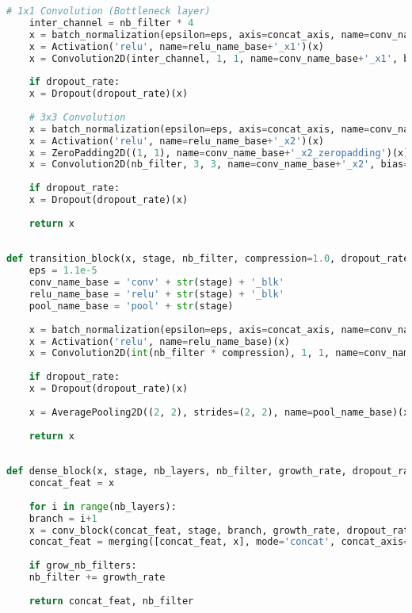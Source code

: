 \begin{lstlisting}[language=Python]
	# 1x1 Convolution (Bottleneck layer)
	inter_channel = nb_filter * 4  
	x = batch_normalization(epsilon=eps, axis=concat_axis, name=conv_name_base+'_x1_bn')(x)
	x = Activation('relu', name=relu_name_base+'_x1')(x)
	x = Convolution2D(inter_channel, 1, 1, name=conv_name_base+'_x1', bias=False)(x)
	
	if dropout_rate:
	x = Dropout(dropout_rate)(x)
	
	# 3x3 Convolution
	x = batch_normalization(epsilon=eps, axis=concat_axis, name=conv_name_base+'_x2_bn')(x)
	x = Activation('relu', name=relu_name_base+'_x2')(x)
	x = ZeroPadding2D((1, 1), name=conv_name_base+'_x2_zeropadding')(x)
	x = Convolution2D(nb_filter, 3, 3, name=conv_name_base+'_x2', bias=False)(x)
	
	if dropout_rate:
	x = Dropout(dropout_rate)(x)
	
	return x
	
	
def transition_block(x, stage, nb_filter, compression=1.0, dropout_rate=None, weight_decay=1E-4):
	eps = 1.1e-5
	conv_name_base = 'conv' + str(stage) + '_blk'
	relu_name_base = 'relu' + str(stage) + '_blk'
	pool_name_base = 'pool' + str(stage) 
	
	x = batch_normalization(epsilon=eps, axis=concat_axis, name=conv_name_base+'_bn')(x)
	x = Activation('relu', name=relu_name_base)(x)
	x = Convolution2D(int(nb_filter * compression), 1, 1, name=conv_name_base, bias=False)(x)
	
	if dropout_rate:
	x = Dropout(dropout_rate)(x)
	
	x = AveragePooling2D((2, 2), strides=(2, 2), name=pool_name_base)(x)
	
	return x
	
	
def dense_block(x, stage, nb_layers, nb_filter, growth_rate, dropout_rate=None, weight_decay=1e-4, grow_nb_filters=True):
	concat_feat = x
	
	for i in range(nb_layers):
	branch = i+1
	x = conv_block(concat_feat, stage, branch, growth_rate, dropout_rate, weight_decay)
	concat_feat = merging([concat_feat, x], mode='concat', concat_axis=concat_axis, name='concat_'+str(stage)+'_'+str(branch))
	
	if grow_nb_filters:
	nb_filter += growth_rate
	
	return concat_feat, nb_filter
\end{lstlisting}